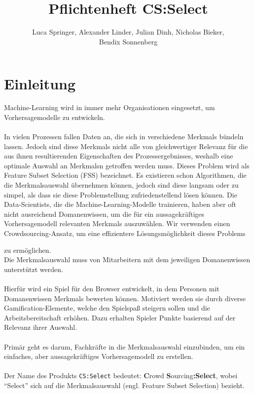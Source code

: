 \documentclass[a4paper]{scrreprt}
\begin{document}
    \title{Pflichtenheft CS:Select}
    \author{Luca Springer, Alexander Linder, Julian Dinh, Nicholas Bieker,\\ Bendix Sonnenberg}
    \maketitle

    \tableofcontents

    \chapter{Einleitung}
    Machine-Learning wird in immer mehr Organisationen eingesetzt, um Vorhersagemodelle zu entwickeln.\\\\
    In vielen Prozessen fallen Daten an, die sich in verschiedene \Glspl{Merkmal} bündeln lassen.
    Jedoch sind diese \Glspl{Merkmal} nicht alle von gleichwertiger Relevanz für die aus ihnen resultierenden Eigenschaften des Prozessergebnisses, weshalb eine optimale Auswahl an \Glspl{Merkmal}n getroffen werden muss.
    Dieses Problem wird als Feature Subset Selection (FSS) bezeichnet.
    Es existieren schon Algorithmen, die die Merkmalsauswahl übernehmen können, jedoch sind diese langsam oder zu simpel, als dass sie diese Problemstellung zufriedenstellend lösen können.
    Die Data-Scientists, die die Machine-Learning-Modelle trainieren, haben aber oft nicht ausreichend \Gls{Domanenwissen}, um die für ein aussagekräftiges Vorhersagemodell relevanten \Glspl{Merkmal} auszuwählen.
    Wir verwenden einen Crowdsourcing-Ansatz, um eine effizientere Lösungsmöglichkeit dieses Problems 
    zu ermöglichen.\\
    Die Merkmalsauswahl muss von Mitarbeitern mit dem jeweiligen \Gls{Domanenwissen} unterstützt werden.\\\\
    Hierfür wird ein \Gls{Spiel} für den Browser entwickelt, in dem Personen mit \Gls{Domanenwissen} \Glspl{Merkmal} bewerten können.
    Motiviert werden sie durch diverse Gamification-Elemente, welche den Spielspaß steigern sollen und die Arbeitsbereitschaft erhöhen.
    Dazu erhalten Spieler Punkte basierend auf der Relevanz ihrer Auswahl.\\\\
    Primär geht es darum, Fachkräfte in die Merkmalsauswahl einzubinden, um ein einfaches, aber aussagekräftiges Vorhersagemodell zu erstellen.\\\\
    Der Name des Produkts \texttt{CS:Select} bedeutet: \textbf{C}rowd \textbf{S}ourcing\textbf{:Select}, wobei \enquote{Select} sich auf die Merkmalsauswahl (engl. Feature Subset Selection) bezieht.
\end{document}
